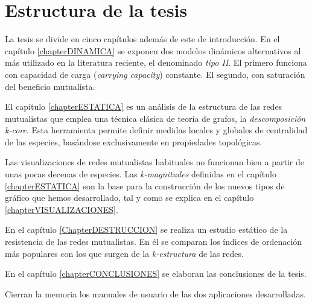 \section{Estructura de la tesis}

La tesis se divide en cinco capítulos además de este de introducción. En el capítulo \ref{chapterDINAMICA} se exponen dos modelos dinámicos alternativos al más utilizado en la literatura reciente, el denominado \textit{tipo II}. El primero funciona con capacidad de carga (\textit{carrying capacity}) constante. El segundo, con saturación del beneficio mutualista.

El capítulo \ref{chapterESTATICA} es un análisis de la estructura de las redes mutualistas que emplea una técnica clásica de teoría de grafos, la \textit{descomposición k-core}. Esta herramienta permite definir medidas locales y globales de centralidad de las especies, basándose exclusivamente en propiedades topológicas.

Las visualizaciones de redes mutualistas habituales no funcionan bien a partir de unas pocas decenas de especies. Las \textit{k-magnitudes} definidas  en el capítulo \ref{chapterESTATICA} son la base para la construcción de los nuevos tipos de gráfico que hemos desarrollado, tal y como se explica en el capítulo \ref{chapterVISUALIZACIONES}.

En el capítulo \ref{ChapterDESTRUCCION} se realiza un estudio estático de la resistencia de las redes mutualistas. En él se comparan los índices de ordenación más populares con los que surgen de la \textit{k-estructura} de las redes.

En el capítulo \ref{chapterCONCLUSIONES} se elaboran las conclusiones de la tesis.

Cierran la memoria los manuales de usuario de las dos aplicaciones desarrolladas.